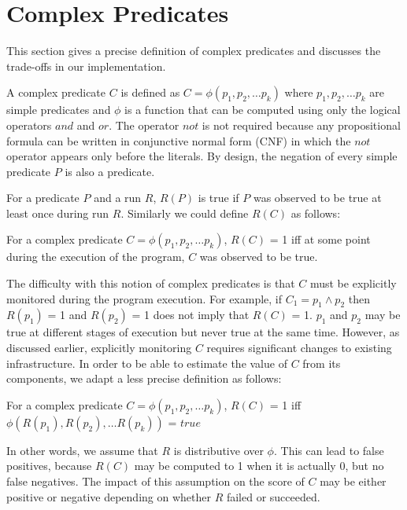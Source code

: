 \section{Complex Predicates}
\label{sec-complex-preds}
This section gives a precise definition of complex predicates and discusses the trade-offs in our implementation.

A complex predicate $C$ is defined as $C = \phi(p_1, p_2, \ldots p_k)$ where $p_1, p_2, \ldots p_k$ are simple predicates and $\phi$ is a function that can be computed using only the logical operators $and$ and $or$.  The operator $not$ is not required because any propositional formula can be written in conjunctive normal form (CNF) in which the $not$ operator appears only before the literals.  By design, the negation of every simple predicate $P$ is also a predicate.

For a predicate $P$ and a run $R$, $R(P)$ is true if $P$ was observed to be true at least once during run $R$.  Similarly we could define $R(C)$ as follows:
\begin{defn}
\label{dfn1}
For a complex predicate $C = \phi(p_1, p_2, \ldots p_k)$, $R(C)$ = 1 iff at some point during the execution of the program, $C$ was observed to be true.
\end{defn}

The difficulty with this notion of complex predicates is that $C$ must be explicitly monitored during the program execution.  For example, if $C_1 = p_1 \wedge p_2$ then $R(p_1)$ = 1 and $R(p_2)$ = 1 does not imply that $R(C)$ = 1.  $p_1$ and $p_2$ may be true at different stages of execution but never true at the same time.  However, as discussed earlier, explicitly monitoring $C$ requires significant changes to existing infrastructure.  In order to be able to estimate the value of $C$ from its components, we adapt a less precise definition as follows:
\begin{defn}
\label{dfn2}
For a complex predicate $C = \phi(p_1, p_2, \ldots p_k)$, $R(C)$ = 1 iff $\phi(R(p_1), R(p_2), \ldots R(p_k))$ = $true$
\end{defn}

In other words, we assume that $R$ is distributive over $\phi$.  This can lead to false positives, because $R(C)$ may be computed to 1 when it is actually 0, but no false negatives.  The impact of this assumption on the score of $C$ may be either positive or negative depending on whether $R$ failed or succeeded.

